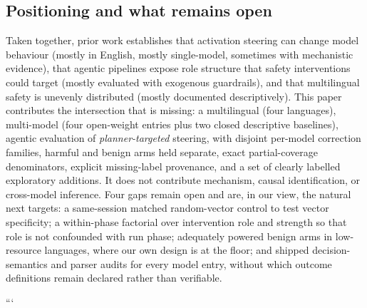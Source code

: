 \subsection{Positioning and what remains open}

Taken together, prior work establishes that activation steering can change model
behaviour (mostly in English, mostly single-model, sometimes with mechanistic
evidence), that agentic pipelines expose role structure that safety
interventions could target (mostly evaluated with exogenous guardrails), and
that multilingual safety is unevenly distributed (mostly documented
descriptively). This paper contributes the intersection that is missing: a
multilingual (four languages), multi-model (four open-weight entries plus two
closed descriptive baselines), agentic evaluation of \emph{planner-targeted}
steering, with disjoint per-model correction families, harmful and benign arms
held separate, exact partial-coverage denominators, explicit missing-label
provenance, and a set of clearly labelled exploratory additions. It does not
contribute mechanism, causal identification, or cross-model inference. Four
gaps remain open and are, in our view, the natural next targets: a same-session
matched random-vector control to test vector specificity; a within-phase
factorial over intervention role and strength so that role is not confounded
with run phase; adequately powered benign arms in low-resource languages, where
our own design is at the floor; and shipped decision-semantics and parser audits
for every model entry, without which outcome definitions remain declared rather
than verifiable.

```

